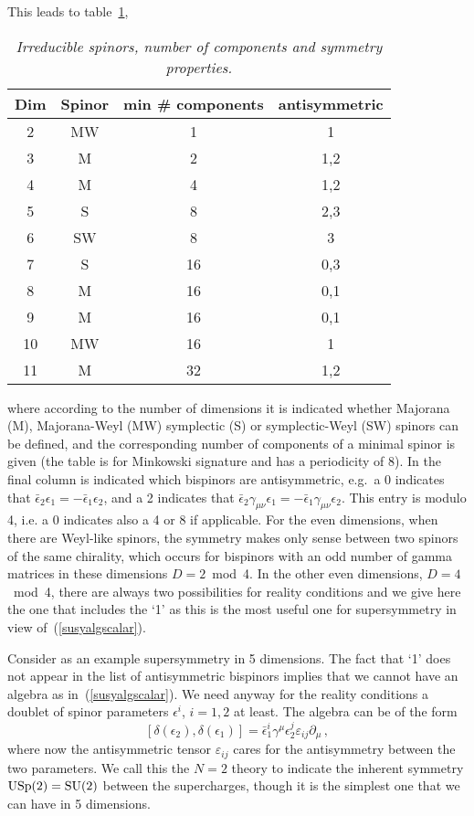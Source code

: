 \documentclass[a4paper,11pt,twoside]{article}
\newcommand{\SU}{\mathop{\rm SU}}
\newcommand{\USp}{\mathop{\rm {}USp}}
\begin{document}
This leads to table~\ref{tbl:spinors},
\begin{table}[htbp]
  \caption{\it Irreducible spinors, number of components and symmetry
  properties.}\label{tbl:spinors}
\begin{center}
  \begin{tabular}{|c|c|c|c|}
\hline
 Dim & Spinor & min \# components & antisymmetric \\
\hline
 2 & MW & 1 & 1 \\
 3 & M & 2 & 1,2 \\
 4 & M & 4 & 1,2 \\
 5 & S & 8 & 2,3 \\
 6 & SW & 8 & 3 \\
 7 & S & 16 & 0,3 \\
 8 & M & 16 & 0,1 \\
 9 & M & 16 & 0,1 \\
 10 & MW & 16 & 1 \\
 11 & M & 32 & 1,2 \\
\hline
\end{tabular}
\end{center}
\end{table}
where according to the number of dimensions it is indicated whether
Majorana (M), Majorana-Weyl (MW) symplectic (S) or symplectic-Weyl (SW)
spinors can be defined, and the corresponding number of components of a
minimal spinor is given (the table is for Minkowski signature and has a
periodicity of 8). In the final column is indicated which bispinors are
antisymmetric, e.g.\ a 0 indicates that $\bar \epsilon _2\epsilon
_1=-\bar \epsilon _1\epsilon _2$, and a 2 indicates that $\bar \epsilon
_2\gamma _{\mu \nu }\epsilon _1=-\bar \epsilon _1\gamma _{\mu \nu
}\epsilon _2$. This entry is modulo 4, i.e. a 0 indicates also a 4 or 8
if applicable. For the even dimensions, when there are Weyl-like spinors,
the symmetry makes only sense between two spinors of the same chirality,
which occurs for bispinors with an odd number of gamma matrices in these
dimensions $D=2$~mod~4. In the other even dimensions, $D=4$~mod~4, there
are always two possibilities for reality conditions and we give here the
one that includes the `1' as this is the most useful one for
supersymmetry in view of~(\ref{susyalgscalar}).

Consider as an example supersymmetry in 5 dimensions. The fact that `1'
does not appear in the list of antisymmetric bispinors implies that we
cannot have an algebra as in~(\ref{susyalgscalar}). We need anyway for
the reality conditions a doublet of spinor parameters $\epsilon ^i$,
$i=1,2$ at least. The algebra can be of the form
\begin{equation}
  \left[\delta (\epsilon _2),\delta (\epsilon _1)\right] =\bar \epsilon _1^i\gamma ^\mu
\epsilon _2^j\varepsilon _{ij}\partial _\mu\,,
 \label{susyalgD5}
\end{equation}
where now the antisymmetric tensor $\varepsilon _{ij}$ cares for the
antisymmetry between the two parameters. We call this the $N=2$ theory to
indicate the inherent symmetry $\USp(2)=\SU(2)$ between the supercharges,
though it is the simplest one that we can have in 5 dimensions.
\end{document}
